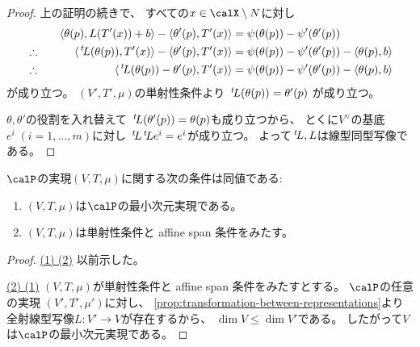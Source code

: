 \documentclass[report]{jlreq}
\begin{document}
\begin{proof}
    上の証明の続きで、
    すべての$x \in \calX \setminus N$に対し
    \begin{alignat}{2}
        &\phantom{\therefore}&
            \left\langle{\theta(p)},{L(T'(x)) + b}\right\rangle
            - \left\langle{\theta'(p)},{T'(x)}\right\rangle
            &=
                \psi(\theta(p)) - \psi'(\theta'(p))
                \\
        &\therefore \quad&
            \langle{\,{}^{t}\!L(\theta(p))},{T'(x)}\rangle
            - \left\langle{\theta'(p)},{T'(x)}\right\rangle
            &=
                \psi(\theta(p)) - \psi'(\theta'(p))
                - \left\langle{\theta(p)},{b}\right\rangle
                \\
        &\therefore \quad&
            \langle{\,{}^{t}\!L(\theta(p)) - \theta'(p)},{T'(x)}\rangle
            &=
                \psi(\theta(p)) - \psi'(\theta'(p))
                - \left\langle{\theta(p)},{b}\right\rangle
    \end{alignat}
    が成り立つ。
    $(V', T', \mu)$の単射性条件より
    $\,{}^{t}\!L(\theta(p)) = \theta'(p)$
    が成り立つ。

    $\theta, \theta'$の役割を入れ替えて
    $\,{}^{t}\!L(\theta'(p)) = \theta(p)$も成り立つから、
    とくに$V^\vee$の基底$e^i \; (i = 1, \dots, m)$に対し
    $\,{}^{t}\!L \,{}^{t}\!L e^i = e^i$が成り立つ。
    よって$\,{}^{t}\!L, L$は線型同型写像である。
\end{proof}

\begin{theorem}[最小次元実現の特徴づけ]
    $\calP$の実現$(V, T, \mu)$に関する次の条件は同値である:
    \begin{enumerate}
        \item $(V, T, \mu)$は$\calP$の最小次元実現である。
        \item $(V, T, \mu)$は単射性条件と affine span 条件をみたす。
    \end{enumerate}
\end{theorem}

\begin{proof}
    \uline{(1) \Rightarrow (2)} \quad
    以前示した。

    \uline{(2) \Rightarrow (1)} \quad
    $(V, T, \mu)$が単射性条件と affine span 条件をみたすとする。
    $\calP$の任意の実現
    $(V', T', \mu')$に対し、
    \cref{prop:transformation-between-representations}より
    全射線型写像$L: V' \to V$が存在するから、
    $\dim V \le \dim V'$である。
    したがって$V$は$\calP$の最小次元実現である。
\end{proof}
\end{document}
